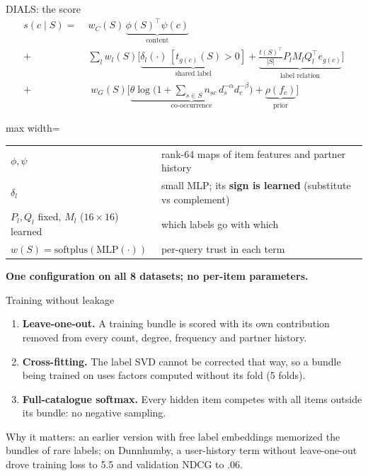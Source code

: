 \documentclass[10pt,aspectratio=169]{beamer}
\newcommand{\key}[1]{\textcolor{Accent}{\textbf{#1}}}
\newcommand{\fn}[1]{\textcolor{Muted}{\scriptsize #1}}
\begin{document}
\begin{frame}{DIALS: the score}
\small
\begin{align*}
 s(c\mid S)=\;&w_C(S)\,\underbrace{\phi(S)^\top\psi(c)}_{\text{content}}\\
 +&\sum_l w_l(S)\Big[\underbrace{\delta_l(\cdot)\,[t_{g(c)}(S)>0]}_{\text{shared label}}+\underbrace{\tfrac{t(S)^\top}{|S|}P_lM_lQ_l^\top e_{g(c)}}_{\text{label relation}}\Big]\\
 +&\;w_G(S)\Big[\underbrace{\theta\log\big(1+\textstyle\sum_{s\in S} n_{sc}\,d_s^{-\alpha}d_c^{-\beta}\big)}_{\text{co-occurrence}}+\underbrace{\rho(f_c)}_{\text{prior}}\Big]
\end{align*}
\vspace{2mm}
\renewcommand{\arraystretch}{1.1}\footnotesize
\begin{adjustbox}{max width=\textwidth}\begin{tabular}{@{}p{}p{}@{}}
$\phi,\psi$ & rank-64 maps of item features and partner history\\
$\delta_l$ & small MLP; its \key{sign is learned} (substitute vs complement)\\
$P_l,Q_l$ fixed, $M_l$ ($16\times16$) learned & which labels go with which\\
$w(S)=\mathrm{softplus}(\mathrm{MLP}(\cdot))$ & per-query trust in each term\\
\end{tabular}\end{adjustbox}\par
\vspace{3mm}
\key{One configuration on all 8 datasets; no per-item parameters.}
\end{frame}

\begin{frame}{Training without leakage}
\begin{enumerate}\setlength\itemsep{8pt}
\item \key{Leave-one-out.} A training bundle is scored with its own contribution removed from every count, degree, frequency and partner history.
\item \key{Cross-fitting.} The label SVD cannot be corrected that way, so a bundle being trained on uses factors computed without its fold (5 folds).
\item \key{Full-catalogue softmax.} Every hidden item competes with all items outside its bundle: no negative sampling.
\end{enumerate}
\vspace{4mm}
\fn{Why it matters: an earlier version with free label embeddings memorized the bundles of rare labels; on Dunnhumby, a user-history term without leave-one-out drove training loss to 5.5 and validation NDCG to .06.}
\end{frame}
\end{document}
